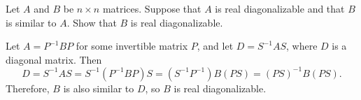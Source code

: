 \documentclass{ximera}
\begin{document}
\begin{exercise} \label{c10.3.5}
Let $A$ and $B$ be $n\times n$ matrices.  Suppose that $A$ is real 
diagonalizable and that $B$ is similar to $A$.  Show that $B$ is 
real diagonalizable.

\begin{solution}

Let $A = P^{-1}BP$ for some invertible matrix $P$, and let
$D = S^{-1}AS$, where $D$ is a diagonal matrix.  Then
\[
D = S^{-1}AS = S^{-1}(P^{-1}BP)S = (S^{-1}P^{-1})B(PS) = 
(PS)^{-1}B(PS).
\]
Therefore, $B$ is also similar to $D$, so $B$ is real diagonalizable.

\end{solution}
\end{exercise}
\end{document}

